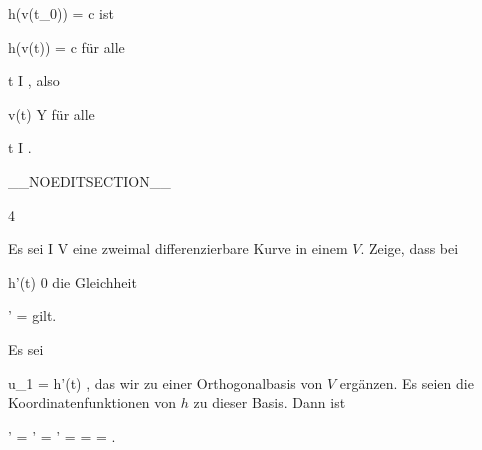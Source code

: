 {\mavergleichskette
{\vergleichskette
{ h(v(t_0))
}
{ = }{ c
}
{  }{
}
{    }{
}
{   }{
}
}
{}{}{}
ist

\mavergleichskette
{\vergleichskette
{ h(v(t))
}
{ = }{ c
}
{  }{
}
{    }{
}
{   }{
}
}
{}{}{}
für alle

\mavergleichskette
{\vergleichskette
{ t
}
{ \in }{ I
}
{  }{
}
{    }{
}
{   }{
}
}
{}{}{,}
also

\mavergleichskette
{\vergleichskette
{ v(t)
}
{ \in }{ Y
}
{  }{
}
{    }{
}
{   }{
}
}
{}{}{}
für alle

\mavergleichskette
{\vergleichskette
{ t
}
{ \in }{ I
}
{  }{
}
{    }{
}
{   }{
}
}
{}{}{.}

 }

__NOEDITSECTION__

{4}

{

Es sei
 { I } { V
} {}
eine zweimal differenzierbare Kurve in einem
$V$. Zeige, dass bei

\mavergleichskette
{\vergleichskette
{h'(t)
}
{ \neq }{ 0
}
{  }{
}
{    }{
}
{   }{
}
}
{}{}{}
die Gleichheit

\mavergleichskettedisp
{\vergleichskette
{  \Vert'
}
{ =} { {  }  \Vert
}
{ } {
}
{ } {
}
{ } {
}
}
{}{}{}
gilt.

}
{

Es sei

\mavergleichskette
{\vergleichskette
{u_1
}
{ = }{ h'(t)
}
{  }{
}
{    }{
}
{   }{
}
}
{}{}{,}
das wir zu einer Orthogonalbasis
 von $V$ ergänzen. Es seien
 die Koordinatenfunktionen von $h$ zu dieser Basis. Dann ist

\mavergleichskettealign
{\vergleichskettealign
{  \Vert'
}
{ =} {  \Vert'
}
{ =} { '
}
{ =} { {  }
}
{ =} { {  }  
}
}
{
\vergleichskettefortsetzungalign
{ =} { {  }  \Vert
}
{ } {
}
{ } {}
{ } {}
}
{}{.}

 }

